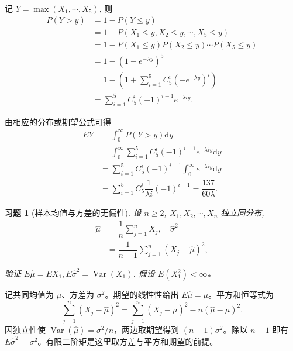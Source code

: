 \documentclass[12pt,fontset=fandol]{ctexart}
\newtheorem{exercise}{习题}[section]
\begin{document}
\begin{solve}\label{a:A5.17}
    记 $Y=\max(X_1,\cdots,X_5)$, 则
    \begin{align*}
        P(Y>y) & =1-P(Y\leq y) \\
        & =1-P(X_1\leq y,X_2\leq y,\cdots,X_5\leq y) \\
        & =1-P(X_1\leq y)P(X_2\leq y)\cdots P(X_5\leq y) \\
        & =1-(1-e^{-\lambda y})^5 \\
        & =1-\left(1+\sum\limits_{i=1}^5C_5^i(-e^{-\lambda y})^i\right) \\
        & =\sum\limits_{i=1}^5C_5^i(-1)^{i-1}e^{-\lambda iy}.
    \end{align*}

    由相应的分布或期望公式可得
    \begin{align*}
        EY & =\int_0^\infty P(Y>y)\mathrm{d}y \\
        & =\int_0^\infty\sum\limits_{i=1}^5C_5^i(-1)^{i-1}e^{-\lambda iy}\mathrm{d}y \\
        & =\sum\limits_{i=1}^5C_5^i(-1)^{i-1}\int_0^\infty e^{-\lambda iy}\mathrm{d}y \\
        & =\sum\limits_{i=1}^5C_5^i\dfrac{1}{\lambda i}(-1)^{i-1}=\dfrac{137}{60\lambda}.
    \end{align*}
\end{solve}

\begin{exercise}[样本均值与方差的无偏性]\label{q:A5.20}
设 $n\geq 2$, $X_1,X_2,\cdots,X_n$ 独立同分布,
    \[\begin{aligned}\hat{\mu}&=\dfrac{1}{n}\sum\limits_{j=1}^nX_j,\quad\hat{\sigma}^2\\&=\dfrac{1}{n-1}\sum\limits_{j=1}^n(X_j-\hat{\mu})^2,\end{aligned}\]

    验证 $E\hat{\mu}=EX_1,E\hat{\sigma}^2=\operatorname{Var}(X_1)$. 假设 $E(X_1^2)<\infty$。\par{}
\end{exercise}

\begin{solve}\label{a:A5.20}记共同均值为 $\mu$、方差为 $\sigma^2$。期望的线性性给出 $E\widehat\mu=\mu$。平方和恒等式为\[\sum_{j=1}^n(X_j-\widehat\mu)^2=\sum_{j=1}^n(X_j-\mu)^2-n(\widehat\mu-\mu)^2.\]因独立性使 $\operatorname{Var}(\widehat\mu)=\sigma^2/n$，两边取期望得到 $(n-1)\sigma^2$。除以 $n-1$ 即有 $E\widehat\sigma^2=\sigma^2$。有限二阶矩是这里取方差与平方和期望的前提。\end{solve}
\end{document}
